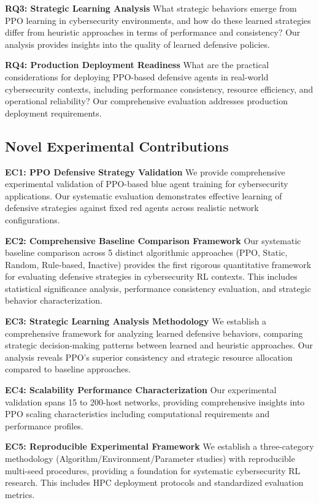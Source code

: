 \documentclass[12pt,oneside,a4paper]{article}
\theoremstyle{definition}
\theoremstyle{plain}
\begin{document}
\textbf{RQ3: Strategic Learning Analysis}
What strategic behaviors emerge from PPO learning in cybersecurity environments, and how do these learned strategies differ from heuristic approaches in terms of performance and consistency? Our analysis provides insights into the quality of learned defensive policies.

\textbf{RQ4: Production Deployment Readiness}
What are the practical considerations for deploying PPO-based defensive agents in real-world cybersecurity contexts, including performance consistency, resource efficiency, and operational reliability? Our comprehensive evaluation addresses production deployment requirements.

\subsection{Novel Experimental Contributions}

\textbf{EC1: PPO Defensive Strategy Validation}
We provide comprehensive experimental validation of PPO-based blue agent training for cybersecurity applications. Our systematic evaluation demonstrates effective learning of defensive strategies against fixed red agents across realistic network configurations.

\textbf{EC2: Comprehensive Baseline Comparison Framework}
Our systematic baseline comparison across 5 distinct algorithmic approaches (PPO, Static, Random, Rule-based, Inactive) provides the first rigorous quantitative framework for evaluating defensive strategies in cybersecurity RL contexts. This includes statistical significance analysis, performance consistency evaluation, and strategic behavior characterization.

\textbf{EC3: Strategic Learning Analysis Methodology}
We establish a comprehensive framework for analyzing learned defensive behaviors, comparing strategic decision-making patterns between learned and heuristic approaches. Our analysis reveals PPO's superior consistency and strategic resource allocation compared to baseline approaches.

\textbf{EC4: Scalability Performance Characterization}
Our experimental validation spans 15 to 200-host networks, providing comprehensive insights into PPO scaling characteristics including computational requirements and performance profiles.

\textbf{EC5: Reproducible Experimental Framework}
We establish a three-category methodology (Algorithm/Environment/Parameter studies) with reproducible multi-seed procedures, providing a foundation for systematic cybersecurity RL research. This includes HPC deployment protocols and standardized evaluation metrics.
\end{document}
